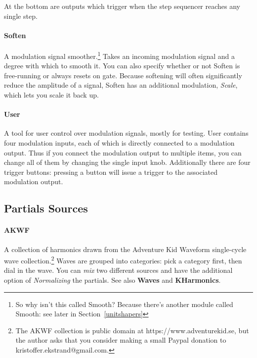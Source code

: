 \documentclass{article}
\begin{document}
At the bottom are outputs which trigger when the step sequencer reaches any single step.

\paragraph{Soften}  A modulation signal smoother.\footnote{So why isn't this called Smooth?  Because there's another module called Smooth: see later in Section~\ref{unitshapers}}  Takes an incoming modulation signal and a degree with which to smooth it.  You can also specify whether or not Soften is free-running or always resets on gate.   Because softening will often significantly reduce the amplitude of a signal, Soften has an additional modulation, {\it Scale}, which lets you scale it back up.


\paragraph{User}  A tool for user control over modulation signals, mostly for testing.  User contains four modulation inputs, each of which is directly connected to a modulation output.  Thus if you connect the modulation output to multiple items, you can change all of them by changing the single input knob. Additionally there are four trigger buttons: pressing a button will issue a trigger to the associated modulation output.



\subsection{Partials Sources}

\paragraph{AKWF}  A collection of harmonics drawn from the Adventure Kid Waveform single-cycle wave collection.\footnote{The AKWF collection is public domain at https:/\!/www.adventurekid.se, but the author asks that you consider making a small Paypal donation to kristoffer.ekstrand@gmail.com.}  Waves are grouped into categories: pick a category first, then dial in the wave.  You can {\it mix} two different sources and have the additional option of {\it Normalizing} the partials.  See also {\bf Waves} and {\bf KHarmonics}.
\end{document}
